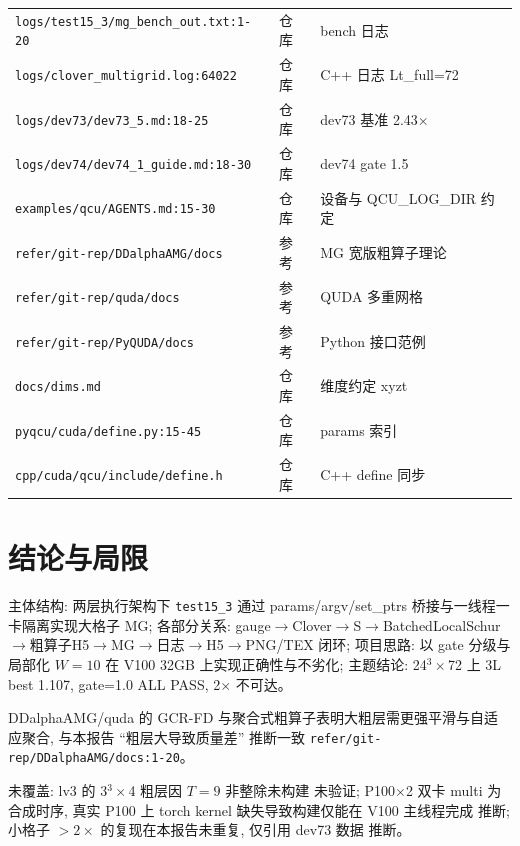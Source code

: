 \documentclass[UTF8]{ctexart}
\begin{document}
\begin{xltabular}{\textwidth}{llX}
\texttt{\nolinkurl{logs/test15_3/mg_bench_out.txt:1-20}} & 仓库 & bench 日志 \\
\texttt{\nolinkurl{logs/clover_multigrid.log:64022}} & 仓库 & C++ 日志 Lt\_full=72 \\
\texttt{\nolinkurl{logs/dev73/dev73_5.md:18-25}} & 仓库 & dev73 基准 2.43$\times$ \\
\texttt{\nolinkurl{logs/dev74/dev74_1_guide.md:18-30}} & 仓库 & dev74 gate 1.5 \\
\texttt{\nolinkurl{examples/qcu/AGENTS.md:15-30}} & 仓库 & 设备与 QCU\_LOG\_DIR 约定 \\
\texttt{\nolinkurl{refer/git-rep/DDalphaAMG/docs}} & 参考 & MG 宽版粗算子理论 \\
\texttt{\nolinkurl{refer/git-rep/quda/docs}} & 参考 & QUDA 多重网格 \\
\texttt{\nolinkurl{refer/git-rep/PyQUDA/docs}} & 参考 & Python 接口范例 \\
\texttt{\nolinkurl{docs/dims.md}} & 仓库 & 维度约定 xyzt \\
\texttt{\nolinkurl{pyqcu/cuda/define.py:15-45}} & 仓库 & params 索引 \\
\texttt{\nolinkurl{cpp/cuda/qcu/include/define.h}} & 仓库 & C++ define 同步 \\
\bottomrule
\end{xltabular}

\section{结论与局限}
\begin{conclbox}
主体结构: 两层执行架构下 \texttt{\nolinkurl{test15_3}} 通过 params/argv/set\_ptrs 桥接与一线程一卡隔离实现大格子 MG; 各部分关系: gauge$\to$Clover$\to$S$\to$BatchedLocalSchur$\to$粗算子H5$\to$MG$\to$日志$\to$H5$\to$PNG/TEX 闭环; 项目思路: 以 gate 分级与局部化 $W=10$ 在 V100 32GB 上实现正确性与不劣化; 主题结论: 24$^3\times$72 上 3L best 1.107, gate=1.0 ALL PASS, 2$\times$ 不可达。
\end{conclbox}
\begin{refbox}
DDalphaAMG/quda 的 GCR-FD 与聚合式粗算子表明大粗层需更强平滑与自适应聚合, 与本报告 ``粗层大导致质量差'' 推断一致 \textcolor{evidence}{\texttt{\nolinkurl{refer/git-rep/DDalphaAMG/docs:1-20}}}。
\end{refbox}
\begin{warnbox}
未覆盖: lv3 的 3$^3\times$4 粗层因 $T=9$ 非整除未构建 \textcolor{warn}{未验证}; P100$\times$2 双卡 multi 为合成时序, 真实 P100 上 torch kernel 缺失导致构建仅能在 V100 主线程完成 \textcolor{warn}{推断}; 小格子 $>2\times$ 的复现在本报告未重复, 仅引用 dev73 数据 \textcolor{warn}{推断}。
\end{warnbox}
\end{document}
